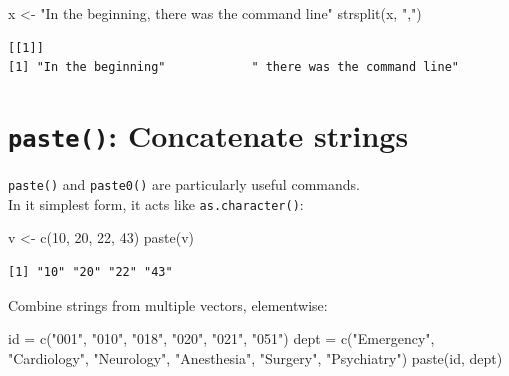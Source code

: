 \documentclass[
]{book}
\newenvironment{Shaded}{\begin{snugshade}}{\end{snugshade}}
\newcommand{\DecValTok}[1]{\textcolor[rgb]{0.00,0.00,0.81}{#1}}
\newcommand{\FunctionTok}[1]{\textcolor[rgb]{0.00,0.00,0.00}{#1}}
\newcommand{\NormalTok}[1]{#1}
\newcommand{\OtherTok}[1]{\textcolor[rgb]{0.56,0.35,0.01}{#1}}
\newcommand{\StringTok}[1]{\textcolor[rgb]{0.31,0.60,0.02}{#1}}
\begin{document}
\begin{Shaded}
\begin{Highlighting}[]
\NormalTok{x }\OtherTok{\textless{}{-}} \StringTok{"In the beginning, there was the command line"}
\FunctionTok{strsplit}\NormalTok{(x, }\StringTok{","}\NormalTok{)}
\end{Highlighting}
\end{Shaded}

\begin{verbatim}
[[1]]
[1] "In the beginning"            " there was the command line"
\end{verbatim}

\hypertarget{paste-concatenate-strings}{%
\section{\texorpdfstring{\texttt{paste()}: Concatenate strings}{paste(): Concatenate strings}}\label{paste-concatenate-strings}}

\texttt{paste()} and \texttt{paste0()} are particularly useful commands.\\
In it simplest form, it acts like \texttt{as.character()}:

\begin{Shaded}
\begin{Highlighting}[]
\NormalTok{v }\OtherTok{\textless{}{-}} \FunctionTok{c}\NormalTok{(}\DecValTok{10}\NormalTok{, }\DecValTok{20}\NormalTok{, }\DecValTok{22}\NormalTok{, }\DecValTok{43}\NormalTok{)}
\FunctionTok{paste}\NormalTok{(v)}
\end{Highlighting}
\end{Shaded}

\begin{verbatim}
[1] "10" "20" "22" "43"
\end{verbatim}

Combine strings from multiple vectors, elementwise:

\begin{Shaded}
\begin{Highlighting}[]
\NormalTok{id }\OtherTok{=} \FunctionTok{c}\NormalTok{(}\StringTok{"001"}\NormalTok{, }\StringTok{"010"}\NormalTok{, }\StringTok{"018"}\NormalTok{, }\StringTok{"020"}\NormalTok{, }\StringTok{"021"}\NormalTok{, }\StringTok{"051"}\NormalTok{)}
\NormalTok{dept }\OtherTok{=} \FunctionTok{c}\NormalTok{(}\StringTok{"Emergency"}\NormalTok{, }\StringTok{"Cardiology"}\NormalTok{, }\StringTok{"Neurology"}\NormalTok{,}
         \StringTok{"Anesthesia"}\NormalTok{, }\StringTok{"Surgery"}\NormalTok{, }\StringTok{"Psychiatry"}\NormalTok{)}
\FunctionTok{paste}\NormalTok{(id, dept)}
\end{Highlighting}
\end{Shaded}
\end{document}
